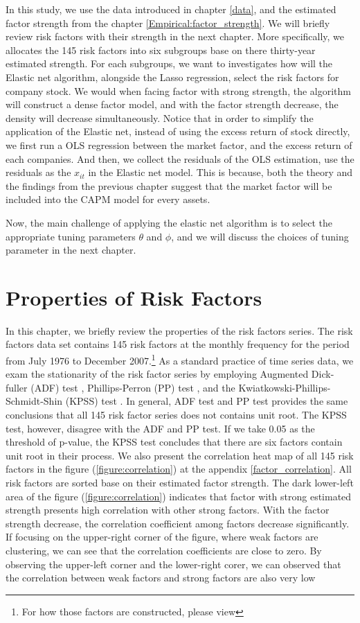 In this study, we use the data introduced in chapter \ref{data}, and the estimated factor strength from the chapter \ref{Empirical:factor_strength}.
We will briefly review risk factors with their strength in the next chapter.
More specifically, we allocates the 145 risk factors into six subgroups base on there thirty-year estimated strength.
For each subgroups, we want to investigates how will the Elastic net algorithm, alongside the Lasso regression, select the risk factors for company stock.
We would when facing factor with strong strength, the algorithm will construct a dense factor model, and with the factor strength decrease, the density will decrease simultaneously.
Notice that in order to simplify the application of the Elastic net, instead of using the excess return of stock directly, we first run a OLS regression between the market factor, and the excess return of each companies.
And then, we collect the residuals of the OLS estimation, use the residuals as the $x_{it}$ in the Elastic net model.
This is because, both the theory and the findings from the previous chapter suggest that the market factor will be included into the CAPM model for every assets.

Now, the main challenge of applying the elastic net algorithm is to select the appropriate tuning parameters $\theta$ and $\phi$, and we will discuss the choices of tuning parameter in the next chapter.

	\section{Properties of Risk Factors}
In this chapter, we briefly review the properties of the risk factors series. 
The risk factors data set contains 145 risk factors at the monthly frequency for the period from July 1976 to December 2007.\footnote{For how those factors are constructed, please view }
As a standard practice of time series data, we exam the stationarity of the risk factor series by employing Augmented Dick-fuller (ADF) test \cite{Dickey1979},  Phillips-Perron (PP) test \cite{Phillips1988}, and the Kwiatkowski-Phillips-Schmidt-Shin (KPSS) test \cite{Kwiatkowski1992}.
In general, ADF test and PP test provides the same conclusions that all 145 risk factor series does not contains unit root.
The KPSS test, however, disagree with the ADF and PP test.
If we take 0.05 as the threshold of p-value, the KPSS test concludes that there are six factors contain unit root in their process.
We also present the correlation heat map of all 145 risk factors in the figure (\ref{figure:correlation}) at the appendix \ref{factor_correlation}.
All risk factors are sorted base on their estimated factor strength.
The dark lower-left area of the figure (\ref{figure:correlation}) indicates that factor with strong estimated strength presents high correlation with other strong factors.
With the factor strength decrease, the correlation coefficient among factors decrease significantly.
If focusing on the upper-right corner of the figure, where weak factors are clustering, we can see that the correlation coefficients are close to zero.
By observing the upper-left corner and the lower-right corer, we can observed that the correlation between weak factors and strong factors are also very low


